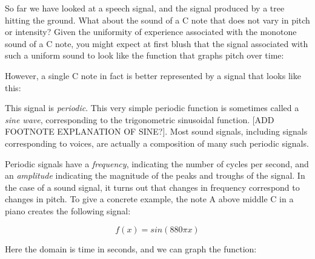 \documentclass[UTF8]{book}
\begin{document}
\begin{CJK}{UTF8}{gbsn}
So far we have looked at a speech signal, and the signal produced by a tree hitting the ground. What about the sound of a C note that does not vary in pitch or intensity? Given the uniformity of experience associated with the monotone sound of a C note, you might expect at first blush that the signal associated with such a uniform sound to look like the function that graphs pitch over time:


However, a single C note in fact is better represented by a signal that looks like this:


This signal is \emph{periodic}. This very simple periodic function is sometimes called a \emph{sine wave}, corresponding to the trigonometric sinusoidal function. [ADD FOOTNOTE EXPLANATION OF SINE?]. Most sound signals, including signals corresponding to voices, are actually a composition of many such periodic signals.

Periodic signals have a \emph{frequency}, indicating the number of cycles per second, and an \emph{amplitude} indicating the magnitude of the peaks and troughs of the signal. In the case of a sound signal, it turns out that changes in frequency correspond to changes in pitch. To give a concrete example, the note A above middle C in a piano creates the following signal:

\[ f(x) = sin(880\pi x) \]

Here the domain is time in seconds, and we can graph the function:



\end{CJK}
\end{document}
